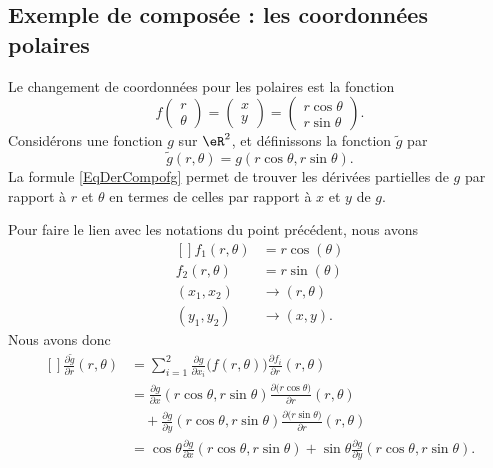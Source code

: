 \subsection{Exemple de composée : les coordonnées polaires}

Le changement de coordonnées pour les polaires est la fonction
\begin{equation}
    f\begin{pmatrix}
        r    \\ 
        \theta    
    \end{pmatrix}=\begin{pmatrix}
        x    \\ 
        y    
    \end{pmatrix}=\begin{pmatrix}
        r\cos\theta    \\ 
        r\sin\theta    
    \end{pmatrix}.
\end{equation}
Considérons une fonction $g$ sur $\eR^2$, et définissons la fonction $\tilde g$ par
\begin{equation}
    \tilde g(r,\theta)=g(r\cos\theta,r\sin\theta).
\end{equation}
La formule \eqref{EqDerCompofg} permet de trouver les dérivées partielles de $g$ par rapport à $r$ et $\theta$ en termes de celles par rapport à $x$ et $y$ de $g$.

Pour faire le lien avec les notations du point précédent, nous avons
\begin{equation}
    \begin{aligned}[]
        f_1(r,\theta)&=r\cos(\theta)\\
        f_2(r,\theta)&=r\sin(\theta)\\
        (x_1,x_2)&\to(r,\theta)\\
        (y_1,y_2)&\to(x,y).
    \end{aligned}
\end{equation}
Nous avons donc 
\begin{equation}
    \begin{aligned}[]
        \frac{ \partial \tilde g }{ \partial r }(r,\theta)&=\sum_{i=1}^2\frac{ \partial g }{ \partial x_i }\big( f(r,\theta) \big)\frac{ \partial f_i }{ \partial r }(r,\theta)\\
        &=\frac{ \partial g }{ \partial x }(r\cos\theta,r\sin\theta)\frac{ \partial \big( r\cos\theta \big) }{ \partial r }(r,\theta)\\
        &\quad+\frac{ \partial g }{ \partial y }(r\cos\theta,r\sin\theta)\frac{ \partial \big( r\sin\theta\big) }{ \partial r }(r,\theta)\\
        &=\cos\theta\frac{ \partial g }{ \partial x }(r\cos\theta,r\sin\theta)+\sin\theta\frac{ \partial g }{ \partial y }(r\cos\theta,r\sin\theta).
    \end{aligned}
\end{equation}

